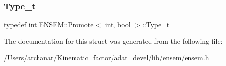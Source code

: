 \subsubsection{\texorpdfstring{Type\_t}{Type\_t}\hspace{0.1cm}{\footnotesize\ttfamily [2/2]}}
{\footnotesize\ttfamily typedef int \mbox{\hyperlink{structENSEM_1_1Promote}{E\+N\+S\+E\+M\+::\+Promote}}$<$ int, bool $>$\+::\mbox{\hyperlink{structENSEM_1_1Promote_3_01int_00_01bool_01_4_a41a8125f71f49258876367a95577157c}{Type\+\_\+t}}}



The documentation for this struct was generated from the following file\+:\begin{DoxyCompactItemize}
\item 
/\+Users/archanar/\+Kinematic\+\_\+factor/adat\+\_\+devel/lib/ensem/\mbox{\hyperlink{lib_2ensem_2ensem_8h}{ensem.\+h}}\end{DoxyCompactItemize}
